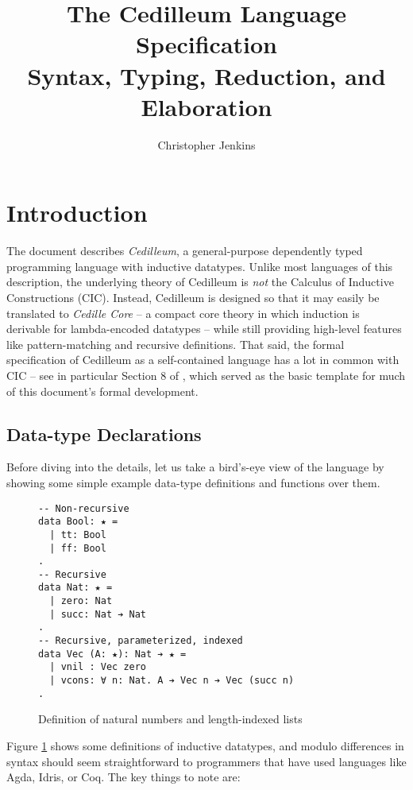 \documentclass{article}
\begin{document}
\title{The Cedilleum Language Specification \\ \large Syntax, Typing, Reduction,
  and Elaboration }

\author{Christopher Jenkins}

\maketitle

\section{Introduction}
The document describes \textit{Cedilleum}, a general-purpose dependently typed
programming language with inductive datatypes. Unlike most languages of this
description, the underlying theory of Cedilleum is \textit{not} the Calculus of
Inductive Constructions (CIC)\cite{Pa15_Intro-CIC}. Instead, Cedilleum is
designed so that it may easily be translated to \textit{Cedille Core} -- a
compact core theory in which induction is derivable for lambda-encoded datatypes
-- while still providing high-level features like pattern-matching and recursive
definitions. That said, the formal specification of Cedilleum as a
self-contained language has a lot in common with CIC -- see in particular
Section 8 of \cite{In18_Coq-Docs}, which served as the basic template for much
of this document's formal development.

\subsection{Data-type Declarations}
Before diving into the details, let us take a bird's-eye view of the language
by showing some simple example data-type definitions and functions over them.

\begin{figure}[h]
\begin{verbatim}
-- Non-recursive
data Bool: ★ =
  | tt: Bool
  | ff: Bool
.
-- Recursive
data Nat: ★ = 
  | zero: Nat
  | succ: Nat ➔ Nat
.
-- Recursive, parameterized, indexed
data Vec (A: ★): Nat ➔ ★ =
  | vnil : Vec zero
  | vcons: ∀ n: Nat. A ➔ Vec n ➔ Vec (succ n)
.
\end{verbatim}
  \caption{Definition of natural numbers and length-indexed lists}
  \label{fig:ex-data-decl}
\end{figure}
Figure \ref{fig:ex-data-decl} shows some definitions of inductive datatypes, and
modulo differences in syntax should seem straightforward to programmers that
have used languages like Agda, Idris, or Coq. The key things to note are:
\end{document}
